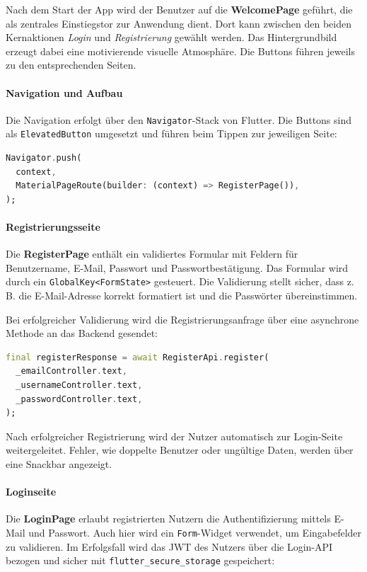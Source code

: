 \documentclass[11pt,a4paper]{article}
\begin{document}
Nach dem Start der App wird der Benutzer auf die \textbf{WelcomePage} geführt, die als zentrales Einstiegstor zur Anwendung dient. Dort kann zwischen den beiden Kernaktionen \textit{Login} und \textit{Registrierung} gewählt werden. Das Hintergrundbild erzeugt dabei eine motivierende visuelle Atmosphäre. Die Buttons führen jeweils zu den entsprechenden Seiten.

\paragraph{Navigation und Aufbau}
Die Navigation erfolgt über den \texttt{Navigator}-Stack von Flutter. Die Buttons sind als \texttt{ElevatedButton} umgesetzt und führen beim Tippen zur jeweiligen Seite:

\begin{lstlisting}[language=Dart, caption=Navigation zu Register- oder Login-Seite]
Navigator.push(
  context,
  MaterialPageRoute(builder: (context) => RegisterPage()),
);
\end{lstlisting}

\paragraph{Registrierungsseite}
Die \textbf{RegisterPage} enthält ein validiertes Formular mit Feldern für Benutzername, E-Mail, Passwort und Passwortbestätigung. Das Formular wird durch ein \texttt{GlobalKey<FormState>} gesteuert. Die Validierung stellt sicher, dass z.\,B. die E-Mail-Adresse korrekt formatiert ist und die Passwörter übereinstimmen.

Bei erfolgreicher Validierung wird die Registrierungsanfrage über eine asynchrone Methode an das Backend gesendet:

\begin{lstlisting}[language=Dart, caption=Registrierungsfunktion mit Backend-Aufruf]
final registerResponse = await RegisterApi.register(
  _emailController.text,
  _usernameController.text,
  _passwordController.text,
);
\end{lstlisting}

Nach erfolgreicher Registrierung wird der Nutzer automatisch zur Login-Seite weitergeleitet. Fehler, wie doppelte Benutzer oder ungültige Daten, werden über eine Snackbar angezeigt.

\paragraph{Loginseite}
Die \textbf{LoginPage} erlaubt registrierten Nutzern die Authentifizierung mittels E-Mail und Passwort. Auch hier wird ein \texttt{Form}-Widget verwendet, um Eingabefelder zu validieren. Im Erfolgsfall wird das JWT des Nutzers über die Login-API bezogen und sicher mit \texttt{flutter\_secure\_storage} gespeichert:
\end{document}
